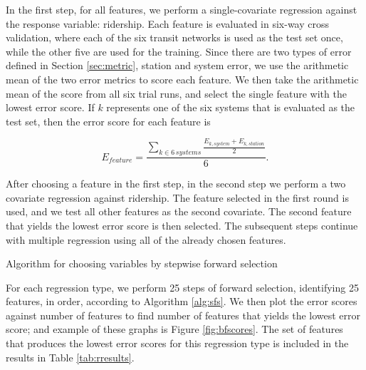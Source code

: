 \documentclass[11pt]{article}
\begin{document}
In the first step, for all features, we perform a single-covariate regression against the response variable: ridership. Each feature is evaluated in six-way cross validation, where each of the six transit networks is used as the test set once, while the other five are used for the training. Since there are two types of error defined in Section \ref{sec:metric}, station and system error, we use the arithmetic mean of the two error metrics to score each feature. We then take the arithmetic mean of the score from all six trial runs, and select the single feature with the lowest error score. If $k$ represents one of the six systems that is evaluated as the test set, then the error score for each feature is

$$ E_{feature} = \displaystyle\frac{\sum\limits_{k\in 6\,systems}\displaystyle\frac{E_{k, system} + E_{k, station}}{2}}{6}.$$

After choosing a feature in the first step, in the second step we perform a two covariate regression against ridership. The feature selected in the first round is used, and we test all other features as the second covariate. The second feature that yields the lowest error score is then selected. The subsequent steps continue with multiple regression using all of the already chosen features. 

\begin{algorithm}\begingroup\fontsize{10}{10}\selectfont
\begin{algorithmic}
	\EndFor
\EndFor
\end{algorithmic}\endgroup\caption{Algorithm for choosing variables by stepwise forward selection}\label{alg:sfs}
\end{algorithm} 

For each regression type, we perform 25 steps of forward selection, identifying 25 features, in order, according to Algorithm \ref{alg:sfs}. We then plot the error scores against number of features to find number of features that yields the lowest error score; and example of these graphs is Figure \ref{fig:bfscores}. The set of features that produces the lowest error scores for this regression type is included in the results in Table \ref{tab:rresults}.
\end{document}
